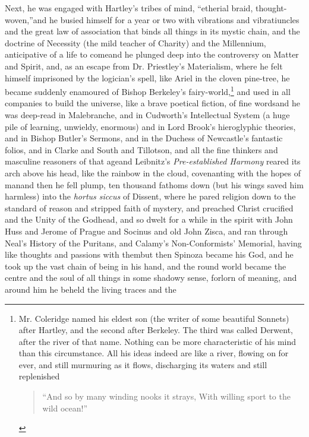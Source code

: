 Next, he was engaged with Hartley's tribes of mind, ``etherial
braid, thought-woven,''\textemdash and he busied himself for a year or two
with vibrations and vibratiuncles and the great law of association
that binds all things in its mystic chain, and the doctrine of
Necessity (the mild teacher of Charity) and the Millennium,
anticipative of a life to come\textemdash and he plunged deep into the
controversy on Matter and Spirit, and, as an escape from
Dr. Priestley's Materialism, where he felt himself imprisoned by
the logician's spell, like Ariel in the cloven pine-tree, he
became suddenly enamoured of Bishop Berkeley's
fairy-world,\footnote{
  Mr. Coleridge named his eldest son (the writer of
some beautiful Sonnets) after Hartley, and the second after
Berkeley. The third was called Derwent, after the river of that
name. Nothing can be more characteristic of his mind than this
circumstance. All his ideas indeed are like a river, flowing on
for ever, and still murmuring as it flows, discharging its waters
and still replenished\textemdash 
\begin{quote}
  ``And so by many winding nooks it strays, With willing sport to
  the wild ocean!''
\end{quote}} and
used in all companies to build the universe, like a brave poetical
fiction, of fine words\textemdash and he was deep-read in Malebranche, and
in Cudworth's Intellectual System (a huge pile of learning,
unwieldy, enormous) and in Lord Brook's hieroglyphic theories, and
in Bishop Butler's Sermons, and in the Duchess of Newcastle's
fantastic folios, and in Clarke and South and Tillotson, and all
the fine thinkers and masculine reasoners of that age\textemdash and
Leibnitz's \emph{Pre-established Harmony} reared its arch above his
head, like the rainbow in the cloud, covenanting with the hopes of
man\textemdash and then he fell plump, ten thousand fathoms down (but his
wings saved him harmless) into the \emph{hortus siccus} of Dissent,
where he pared religion down to the standard of reason and
stripped faith of mystery, and preached Christ crucified and the
Unity of the Godhead, and so dwelt for a while in the spirit with
John Huss and Jerome of Prague and Socinus and old John Zisca, and
ran through Neal's History of the Puritans, and Calamy's
Non-Conformists' Memorial, having like thoughts and passions with
them\textemdash but then Spinoza became his God, and he took up the vast
chain of being in his hand, and the round world became the centre
and the soul of all things in some shadowy sense, forlorn of
meaning, and around him he beheld the living traces and the
